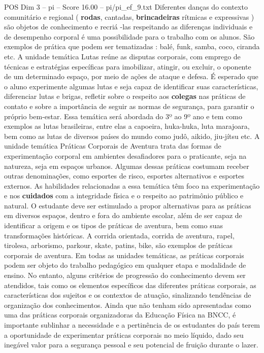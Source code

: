 \begin{textsample}{POS Dim 3 – pi – Score 16.00 – pi/pi\_ef\_9.txt}
Diferentes danças do contexto comunitário e regional ( \textbf{rodas}, cantadas, \textbf{brincadeiras} rítmicas e expressivas ) são objetos de conhecimento e recriá -las respeitando as diferenças individuais e de desempenho corporal é uma possibilidade para o trabalho com os alunos.
São exemplos de prática que podem ser tematizadas : balé, funk, samba, coco, ciranda etc.
A unidade temática Lutas reúne as disputas corporais, com emprego de técnicas e estratégias específicas para imobilizar, atingir, ou excluir, o oponente de um determinado espaço, por meio de ações de ataque e defesa.
É esperado que o aluno experimente algumas lutas e seja capaz de identificar suas características, diferenciar lutas e brigas, refletir sobre o respeito aos \textbf{colegas} nas práticas de contato e sobre a importância de seguir as normas de segurança, para garantir o próprio bem-estar.
Essa temática será abordada do 3º ao 9º ano e tem como exemplos as lutas brasileiras, entre elas a capoeira, huka-huka, luta marajoara, bem como as lutas de diversos países do mundo como judô, aikido, jiu-jítsu etc.
A unidade temática Práticas Corporais de Aventura trata das formas de experimentação corporal em ambientes desafiadores para o praticante, seja na natureza, seja em espaços urbanos.
Algumas dessas práticas costumam receber outras denominações, como esportes de risco, esportes alternativos e esportes externos.
As habilidades relacionadas a essa temática têm foco na experimentação e nos \textbf{cuidados} com a integridade física e o respeito ao patrimônio público e natural.
O estudante deve ser estimulado a propor alternativas para as práticas em diversos espaços, dentro e fora do ambiente escolar, além de ser capaz de identificar a origem e os tipos de práticas de aventura, bem como suas transformações históricas.
A corrida orientada, corrida de aventura, rapel, tirolesa, arborismo, parkour, skate, patins, bike, são exemplos de práticas corporais de aventura.
Em todas as unidades temáticas, as práticas corporais podem ser objeto do trabalho pedagógico em qualquer etapa e modalidade de ensino.
No entanto, alguns critérios de progressão do conhecimento devem ser atendidos, tais como os elementos específicos das diferentes práticas corporais, as características dos sujeitos e os contextos de atuação, sinalizando tendências de organização dos conhecimentos.
Ainda que não tenham sido apresentadas como uma das práticas corporais organizadoras da Educação Física na BNCC, é importante sublinhar a necessidade e a pertinência de os estudantes do país terem a oportunidade de experimentar práticas corporais no meio líquido, dado seu inegável valor para a segurança pessoal e seu potencial de fruição durante o lazer.

\end{textsample}
